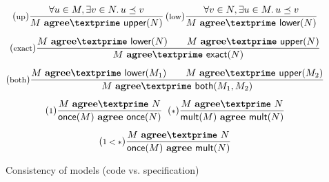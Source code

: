 \documentclass[10pt,preprint]{sigplanconf}
\theoremstyle{definition}
\newcommand{\trule}[1]{{\footnotesize{(\text{#1})}}}
\newcommand{\consName}{\textbf{agree\textprime}}
\newcommand{\cons}[2]{#1 \,\, \consName{} \,\, #2}
\newcommand{\consAName}{\textbf{agree}}
\newcommand{\consA}[2]{#1 \,\, \consAName{} \,\, #2}
\begin{document}
\begin{figure}[t]
\begin{align*}
\hspace{-0.5em}
\begin{array}{c}
\trule{up}\dfrac{\forall u \in M, \exists v \in N .  \, u \preceq v}
      {\cons{M}{\textsf{upper}(N)}}
\,
\trule{low}\dfrac{\forall v \in N, \exists u \in M . \, u \preceq v}
      {\cons{M}{\textsf{lower}(N)}} \\[1.5em]
\trule{exact}\dfrac{\cons{M}{\textsf{lower}(N)} \qquad \cons{M}{\textsf{upper}(N)}}
  {\cons{M}{\textsf{exact}(N)}} \\[1.5em]
\trule{both}\dfrac{\cons{M}{\textsf{lower}(M_1)} \qquad \cons{M}{\textsf{upper}(M_2)}}
  {\cons{M}{\textsf{both}(M_1, M_2)}}\\[1.5em]
\trule{$1$}
\dfrac{\cons{M}{N}}{\consA{\textsf{once}(M)}{\textsf{once}(N)}}
\;\;
\trule{$*$}
\dfrac{\cons{M}{N}}{\consA{\textsf{mult}(M)}{\textsf{mult}(N)}}
  \\[1.5em]
\trule{$1 < *$}
\dfrac{\cons{M}{N}}{\consA{\textsf{once}(M)}{\textsf{mult}(N)}}
\end{array}
\end{align*}
\vspace{-0.5em}
\caption{Consistency of models (code vs. specification)}
\label{fig:consistency}
\vspace{-0.9em}
\end{figure}
\end{document}
